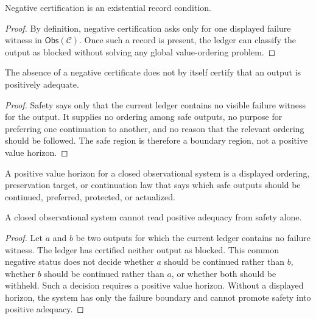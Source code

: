 \begin{theorem}
\label{thm:philosophy-failure-locally-witnessed}
Negative certification is an existential record condition.
\end{theorem}
\begin{proof}
By definition, negative certification asks only for one displayed
failure witness in $\mathsf{Obs}(\mathcal C)$. Once such a record is
present, the ledger can classify the output as blocked without
solving any global value-ordering problem.
\end{proof}

\begin{corollary}
\label{cor:philosophy-safety-weaker-than-positive-adequacy}
The absence of a negative certificate does not by itself certify that
an output is positively adequate.
\end{corollary}
\begin{proof}
Safety says only that the current ledger contains no visible failure
witness for the output. It supplies no ordering among safe outputs, no
purpose for preferring one continuation to another, and no reason that
the relevant ordering should be followed. The safe region is therefore
a boundary region, not a positive value horizon.
\end{proof}

\begin{definition}
\label{def:philosophy-positive-value-horizon}
A positive value horizon for a closed observational system is a
displayed ordering, preservation target, or continuation law that says
which safe outputs should be continued, preferred, protected, or
actualized.
\end{definition}

\begin{theorem}
\label{thm:philosophy-positive-adequacy-requires-horizon}
A closed observational system cannot read positive adequacy from
safety alone.
\end{theorem}
\begin{proof}
Let $a$ and $b$ be two outputs for which the current ledger contains no
failure witness. The ledger has certified neither output as blocked.
This common negative status does not decide whether $a$ should be
continued rather than $b$, whether $b$ should be continued rather than
$a$, or whether both should be withheld. Such a decision requires a
positive value horizon. Without a displayed horizon, the system has
only the failure boundary and cannot promote safety into positive
adequacy.
\end{proof}

